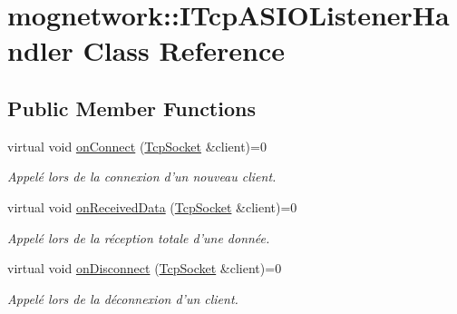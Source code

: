 \hypertarget{classmognetwork_1_1_i_tcp_a_s_i_o_listener_handler}{\section{mognetwork\-:\-:I\-Tcp\-A\-S\-I\-O\-Listener\-Handler Class Reference}
\label{classmognetwork_1_1_i_tcp_a_s_i_o_listener_handler}
}
\subsection*{Public Member Functions}
\begin{DoxyCompactItemize}
\item 
virtual void \hyperlink{classmognetwork_1_1_i_tcp_a_s_i_o_listener_handler_aa1d6b507fc5adc689698c6bd7f0a8ca0}{on\-Connect} (\hyperlink{classmognetwork_1_1_tcp_socket}{Tcp\-Socket} \&client)=0
\begin{DoxyCompactList}\small\item\em Appelé lors de la connexion d'un nouveau client. \end{DoxyCompactList}\item 
virtual void \hyperlink{classmognetwork_1_1_i_tcp_a_s_i_o_listener_handler_a8cc4a40b4addfc1abdf94ba66a545674}{on\-Received\-Data} (\hyperlink{classmognetwork_1_1_tcp_socket}{Tcp\-Socket} \&client)=0
\begin{DoxyCompactList}\small\item\em Appelé lors de la réception totale d'une donnée. \end{DoxyCompactList}\item 
virtual void \hyperlink{classmognetwork_1_1_i_tcp_a_s_i_o_listener_handler_afeb615cb2f1e1f543a6282e21e66c543}{on\-Disconnect} (\hyperlink{classmognetwork_1_1_tcp_socket}{Tcp\-Socket} \&client)=0
\begin{DoxyCompactList}\small\item\em Appelé lors de la déconnexion d'un client. \end{DoxyCompactList}\end{DoxyCompactItemize}


